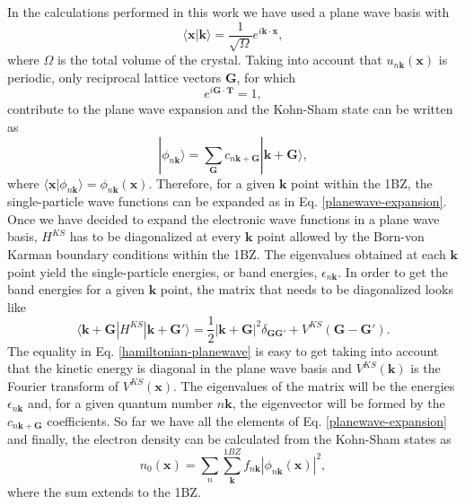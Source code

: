 In the calculations performed in this work we have used a plane wave basis with
\begin{equation}
 \langle\mathbf{x}|\mathbf{k}\rangle=\frac{1}{\sqrt{\Omega}}e^{i\mathbf{k}\cdot\mathbf{x}},
\end{equation} 
where $\Omega$ is the total volume of the crystal. Taking into account that $u_{n\mathbf{k}}(\mathbf{x})$ is periodic, only reciprocal lattice vectors $\mathbf{G}$, for which
\begin{equation}
 e^{i\mathbf{G}\cdot\mathbf{T}}=1,
\end{equation}
contribute to the plane wave expansion and the Kohn-Sham state can be written as
\begin{equation}
 \label{planewave-expansion}
 |\phi_{n\mathbf{k}}\rangle=\sum_{\mathbf{G}}c_{n\mathbf{k}+\mathbf{G}}|\mathbf{k}+\mathbf{G}\rangle,
\end{equation}
where $\langle\mathbf{x}|\phi_{n\mathbf{k}}\rangle=\phi_{n\mathbf{k}}(\mathbf{x})$. Therefore, for a given $\mathbf{k}$ point within the 1BZ, the single-particle wave functions can be expanded as in 
Eq. \ref{planewave-expansion}. \\

Once we have decided to expand the electronic wave functions in a plane wave basis, $H^{KS}$ has to be diagonalized at every $\mathbf{k}$ point allowed by the Born-von Karman boundary conditions within the 1BZ. The 
eigenvalues obtained at each $\mathbf{k}$ point yield the single-particle energies, or band energies, $\epsilon_{n\mathbf{k}}$. In order to get the band energies for a given $\mathbf{k}$ point, the matrix that needs 
to be diagonalized looks like
\begin{equation}
\label{hamiltonian-planewave}
\langle\mathbf{k}+\mathbf{G}|H^{KS}|\mathbf{k}+\mathbf{G}'\rangle=\frac{1}{2}|\mathbf{k}+\mathbf{G}|^{2}\delta_{\mathbf{G}\mathbf{G}'}+V^{KS}(\mathbf{G}-\mathbf{G}').
\end{equation} 
The equality in Eq. \ref{hamiltonian-planewave} is easy to get taking into account that the kinetic energy is diagonal in the plane wave basis and $V^{KS}(\mathbf{k})$ is the Fourier transform of $V^{KS}(\mathbf{x})$. The eigenvalues 
of the matrix will be the energies $\epsilon_{n\mathbf{k}}$ and, for a given quantum number $n\mathbf{k}$, the eigenvector will be formed by the $c_{n\mathbf{k}+\mathbf{G}}$ coefficients. So far we have all the elements of 
Eq. \ref{planewave-expansion} and finally, the electron density can be calculated from the Kohn-Sham states as
\begin{equation}
 n_{0}(\mathbf{x})=\sum_{n}\sum_{\mathbf{k}}^{1BZ}f_{n\mathbf{k}}|\phi_{n\mathbf{k}}(\mathbf{x})|^{2},
\end{equation}
where the sum extends to the 1BZ.

